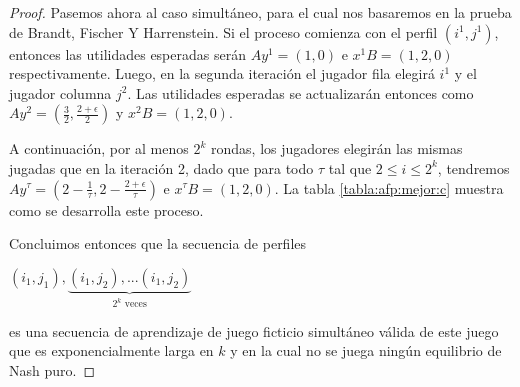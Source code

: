 \begin{proof}
    Pasemos ahora al caso simultáneo, para el cual nos basaremos en la prueba de Brandt, Fischer Y Harrenstein. Si el proceso comienza con el perfil $(i^1, j^1)$, entonces las utilidades esperadas serán $Ay^1 = (1, 0)$ e $x^1 B = (1, 2, 0)$ respectivamente. Luego, en la segunda iteración el jugador fila elegirá $i^1$ y el jugador columna $j^2$. Las utilidades esperadas se actualizarán entonces como $Ay^2 = (\frac{3}{2}, \frac{2 + \epsilon}{2})$ y $x^2 B = (1, 2, 0)$.

    A continuación, por al menos $2^k$ rondas, los jugadores elegirán las mismas jugadas que en la iteración 2, dado que para todo $\tau$ tal que $2 \le i \le 2^k$, tendremos $Ay^\tau = (2 - \frac{1}{\tau}, 2 - \frac{2 + \epsilon}{\tau})$ e $x^\tau B = (1, 2, 0)$. La tabla \ref{tabla:afp:mejor:c} muestra como se desarrolla este proceso.

    Concluimos entonces que la secuencia de perfiles

    \begin{center}
    \begin{math}
        (i_1, j_1), \underbrace{(i_1, j_2), ... (i_1, j_2)}_{\text{$2^k$ veces}}
    \end{math}
    \end{center}


    es una secuencia de aprendizaje de juego ficticio simultáneo válida de este juego que es exponencialmente larga en $k$ y en la cual no se juega ningún equilibrio de Nash puro.

\end{proof}